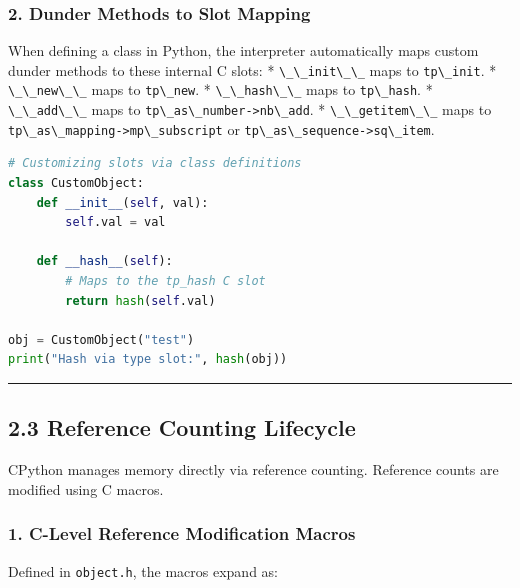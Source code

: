 \hypertarget{dunder-methods-to-slot-mapping}{%
\subsubsection{2. Dunder Methods to Slot
Mapping}\label{dunder-methods-to-slot-mapping}}

When defining a class in Python, the interpreter automatically maps
custom dunder methods to these internal C slots: *
\passthrough{\lstinline!\_\_init\_\_!} maps to
\passthrough{\lstinline!tp\_init!}. *
\passthrough{\lstinline!\_\_new\_\_!} maps to
\passthrough{\lstinline!tp\_new!}. *
\passthrough{\lstinline!\_\_hash\_\_!} maps to
\passthrough{\lstinline!tp\_hash!}. *
\passthrough{\lstinline!\_\_add\_\_!} maps to
\passthrough{\lstinline!tp\_as\_number->nb\_add!}. *
\passthrough{\lstinline!\_\_getitem\_\_!} maps to
\passthrough{\lstinline!tp\_as\_mapping->mp\_subscript!} or
\passthrough{\lstinline!tp\_as\_sequence->sq\_item!}.

\begin{lstlisting}[language=Python]
# Customizing slots via class definitions
class CustomObject:
    def __init__(self, val):
        self.val = val

    def __hash__(self):
        # Maps to the tp_hash C slot
        return hash(self.val)

obj = CustomObject("test")
print("Hash via type slot:", hash(obj))
\end{lstlisting}

\begin{center}\rule{0.5\linewidth}{0.5pt}\end{center}

\hypertarget{reference-counting-lifecycle}{%
\subsection{2.3 Reference Counting
Lifecycle}\label{reference-counting-lifecycle}}

CPython manages memory directly via reference counting. Reference counts
are modified using C macros.

\hypertarget{c-level-reference-modification-macros}{%
\subsubsection{1. C-Level Reference Modification
Macros}\label{c-level-reference-modification-macros}}

Defined in \passthrough{\lstinline!object.h!}, the macros expand as:

